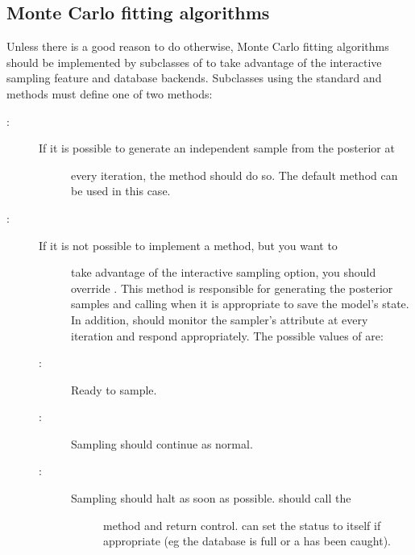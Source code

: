 \documentclass[letterpaper,10pt,english]{sphinxmanual}
\begin{document}
\subsection{Monte Carlo fitting algorithms}
\label{extending:monte-carlo-fitting-algorithms}\label{extending:custom-mc}
Unless there is a good reason to do otherwise, Monte Carlo fitting algorithms should be implemented by subclasses of  to take advantage of the interactive sampling feature and database backends. Subclasses using the standard  and  methods must define one of two methods:
\begin{description}
\item[{:}] \leavevmode\begin{description}
\item[{If it is possible to generate an independent sample from the posterior at}] \leavevmode
every iteration, the  method should do so. The default 
method can be used in this case.

\end{description}

\item[{:}] \leavevmode\begin{description}
\item[{If it is not possible to implement a  method, but you want to}] \leavevmode
take advantage of the interactive sampling option, you should override
. This method is responsible for generating the posterior
samples and calling  when it is appropriate to save the model's
state. In addition,  should monitor the sampler's 
attribute at every iteration and respond appropriately. The possible values
of  are:

\item[{:}] \leavevmode
Ready to sample.

\item[{:}] \leavevmode
Sampling should continue as normal.

\item[{:}] \leavevmode\begin{description}
\item[{Sampling should halt as soon as possible.  should call the}] \leavevmode
{} method and return control.  can set the status to
 itself if appropriate (eg the database is full or a
 has been caught).


\end{description}
\end{description}
\end{description}
\end{document}
